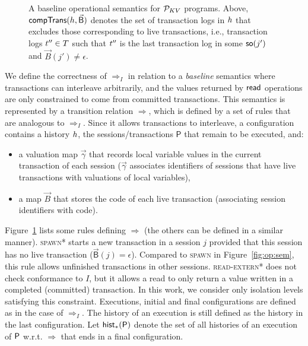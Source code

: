 \begin{figure} [t]
\begin{mathpar}
  \end{mathpar}
 \vspace{-4mm}
  \caption{A baseline operational semantics for $\KVProgs$ programs. Above, $\transC{\hist,\vec{\mathsf{B}}}$ denotes the set of transaction logs in $\hist$ that excludes those corresponding to live transactions, i.e., transaction logs $\tr''\in T$ such that $\tr''$ is the last transaction log in some $\so(j')$ and $\vec{B}(j')\neq\epsilon$.}
  \label{fig:op:sem:baseline}
 \vspace{-4mm}
\end{figure}

We define the correctness of $\Rightarrow_I$ in relation to a \emph{baseline} semantics where transactions can interleave arbitrarily, and the values returned by $\rdo$ operations are only constrained to come from committed transactions. 
This semantics is represented by a transition relation $\Rightarrow$, which is defined by a set of rules that are analogous to $\Rightarrow_I$. 
Since it allows transactions to interleave, a configuration contains a history $\hist$, the sessions/transactions $\mathsf{P}$ that remain to be executed, and:
\begin{itemize}
	\item a valuation map $\vec{\gamma}$ that records local variable values in the current transaction of each session ($\vec{\gamma}$ associates identifiers of sessions that have live transactions with valuations of local variables),
	\item a map $\vec{B}$ that stores the code of each live transaction (associating session identifiers with code).
\end{itemize}
Figure~\ref{fig:op:sem:baseline} lists some rules defining $\Rightarrow$ (the others can be defined in a similar manner). \textsc{spawn*} starts a new transaction in a session $j$ provided that this session has no live transaction ($\vec{\mathsf{B}}(j) = \epsilon$). Compared to \textsc{spawn} in Figure~\ref{fig:op:sem}, this rule allows unfinished transactions in other sessions. \textsc{read-extern*} does not check conformance to $I$, but it allows a read to only return a value written in a completed (committed) transaction. In this work, we consider only isolation levels satisfying this constraint. Executions, initial and final configurations are defined as in the case of $\Rightarrow_I$. The history of an execution is still defined as the history in the last configuration. Let $\histOf[*]{\prog}$ denote the set of all histories of an execution of $\prog$ w.r.t. $\Rightarrow$ that ends in a final configuration.

